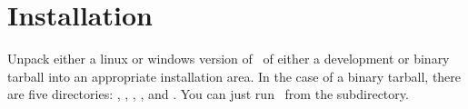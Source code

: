 \documentclass[twoside,twocolumn,9pt]{extarticle}
\begin{document}
% 
% 

\section{Installation}

Unpack either a linux or windows version of \goo\ of either a
development or binary tarball into an appropriate installation area.
In the case of a binary tarball, there are five directories:
, , , , and .  You
can just run \goo\ from the  subdirectory.
\end{document}

